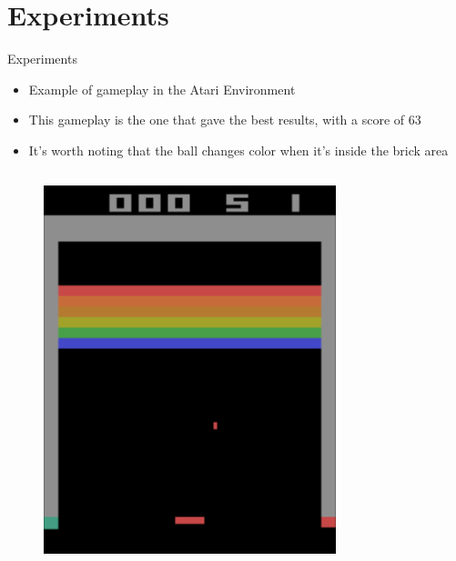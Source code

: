 \section{Experiments}

\begin{frame}{Experiments}
    \begin{itemize}
        \item Example of gameplay in the Atari Environment
        \item This gameplay is the one that gave the best results, with a score of 63
        \item It's worth noting that the ball changes color when it's inside the brick area
    \end{itemize}
    \begin{columns}[c,onlytextwidth]
        \begin{figure}
            \includegraphics[width=\textwidth]{images/atari-sequence-0.png}
        \end{figure}

\end{columns}
\end{frame}
